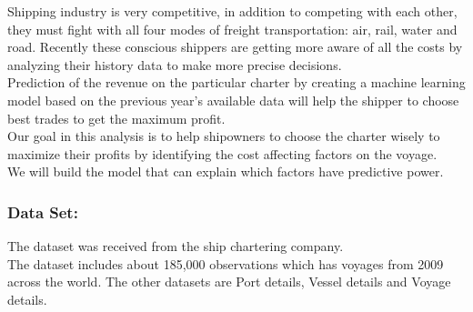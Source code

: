 \documentclass[]{article}
\begin{document}
Shipping industry is very competitive, in addition to competing with
each other, they must fight with all four modes of freight
transportation: air, rail, water and road. Recently these conscious
shippers are getting more aware of all the costs by analyzing their
history data to make more precise decisions.\\
Prediction of the revenue on the particular charter by creating a
machine learning model based on the previous year's available data will
help the shipper to choose best trades to get the maximum profit.\\
Our goal in this analysis is to help shipowners to choose the charter
wisely to maximize their profits by identifying the cost affecting
factors on the voyage.\\
We will build the model that can explain which factors have predictive
power.

\subsubsection{\texorpdfstring{\textbf{Data
Set:}}{Data Set:}}\label{data-set}

The dataset was received from the ship chartering company.\\
The dataset includes about 185,000 observations which has voyages from
2009 across the world. The other datasets are Port details, Vessel
details and Voyage details.
\end{document}
